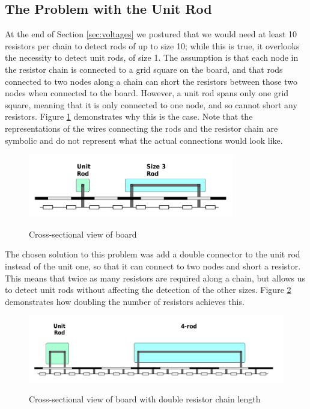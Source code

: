 \subsection{The Problem with the Unit Rod}

At the end of Section \ref{sec:voltages} we postured that we would need at least 10 resistors per chain to detect rods of up to size 10; while this is true, it overlooks the necessity to detect unit rods, of size 1. The assumption is that each node in the resistor chain is connected to a grid square on the board, and that rods connected to two nodes along a chain can short the resistors between those two nodes when connected to the board. However, a unit rod spans only one grid square, meaning that it is only connected to one node, and so cannot short any resistors. Figure \ref{fig:unitrod} demonstrates why this is the case. Note that the representations of the wires connecting the rods and the resistor chain are symbolic and do not represent what the actual connections would look like. 

\begin{figure}[H]
	\begin{center}
	\includegraphics[width=0.8\textwidth]{unitrod.png}\\ 
  	\caption{Cross-sectional view of board}
    \label{fig:unitrod}
    \end{center}
\end{figure}

The chosen solution to this problem was add a double connector to the unit rod instead of the unit one, so that it can connect to two nodes and short a resistor. This means that twice as many resistors are required along a chain, but allows us to detect unit rods without affecting the detection of the other sizes. Figure \ref{fig:doubleunitrod} demonstrates how doubling the number of resistors achieves this.

\begin{figure}[H]
	\begin{center}
	\includegraphics[width=\textwidth]{doubleunitrod.png}\\ 
  	\caption{Cross-sectional view of board with double resistor chain length}
    \label{fig:doubleunitrod}
    \end{center}
\end{figure}

